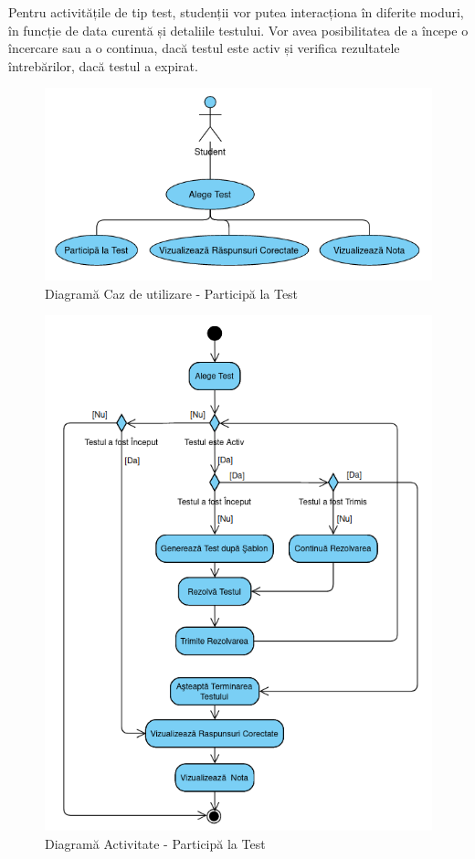 \documentclass[12pt, a4paper, oneside, romanian]{teza-upb}
\begin{document}
Pentru activitățile de tip test, studenții vor putea interacționa în diferite moduri, în funcție de data curentă și detaliile testului. Vor avea posibilitatea de a începe o încercare sau a o continua, dacă testul este activ și verifica rezultatele întrebărilor, dacă testul a expirat. 

\begin{figure}[H]
\centering
\includegraphics*[width=0.7\columnwidth]{diagrama-use-case-participa-la-test}
\caption{Diagramă Caz de utilizare - Participă la Test}
\label{diagrama-use-case-participa-la-test}
\end{figure}


\begin{figure}[H]
\centering
\includegraphics*[width=0.75\columnwidth]{diagrama-activitate-participa-la-test}
\caption{Diagramă Activitate - Participă la Test}
\label{diagrama-activitate-participa-la-test}
\end{figure}
\end{document}
